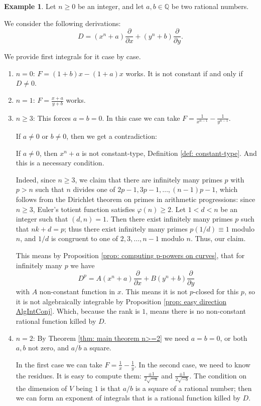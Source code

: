 \documentclass{amsart}
\renewcommand{\phi}{\varphi}
\theoremstyle{definition}
\newtheorem{example}[thm]{Example}
\begin{document}
\begin{example}\label{ex: x^n+a}
Let $n\ge 0$ be an integer, and let $a,b\in \mathbb{Q}$ be two rational numbers.

We consider the following derivations:
\[
D= (x^n+a)\frac{\partial}{\partial x} +(y^n+b)\frac{\partial}{\partial y}.
\]

We provide first integrals for it case by case.
\begin{enumerate}
    \item $n=0$: $F=(1+b)x-(1+a)x$ works. It is not constant if and only if $D\ne 0$.
    \item $n=1$: $F=\frac{x+a}{y+b}$ works.
    \item $n\ge 3$: This forces $a=b=0$. In this case we can take $F=\frac{1}{x^{n-1}}-\frac{1}{y^{n-1}}$.

    If $a\ne 0$ or $b\ne 0$, then we get a contradiction:
    
    If $a\ne 0$, then $x^n+a$ is not constant-type, Definition \ref{def: constant-type}. And this is a necessary condition.
    
    Indeed, since $n\ge 3$, we claim that there are infinitely many primes $p$ with $p>n$ such that $n$ divides one of $2p-1, 3p-1,\ldots, (n-1)p-1$, which follows from the Dirichlet theorem on primes in arithmetic progressions: since $n\ge 3$, Euler's totient function satisfies $\phi(n)\ge 2$. Let $1<d<n$ be an integer such that $(d,n)=1$.
    Then there exist infinitely many primes $p$ such that $nk+d=p$; thus there exist infinitely many primes $p(1/d)\equiv 1$ modulo $n$, and $1/d$ is congruent to one of $2,3,\ldots,n-1$ modulo $ n$. Thus, our claim.

    This means by Proposition \ref{prop: computing p-powers on curves}, that for infinitely many $p$ we have
    \[
    D^p=A(x^n+a)\frac{\partial}{\partial x} +B(y^n+b)\frac{\partial}{\partial y}
    \]
    with $A$ non-constant function in $x$. This means it is not $p$-closed for this $p$, so it is not algebraically integrable by Proposition \ref{prop: easy direction AlgIntConj}. Which, because the rank is $1$, means there is no non-constant rational function killed by $D$.

    \item $n=2$: By Theorem \ref{thm: main theorem n>=2} we need $a=b=0$, or both $a,b$ not zero, and $a/b$ a square.
    
    In the first case we can take $F=\frac{1}{x}-\frac{1}{y}$.
    In the second case, we need to know the residues. It is easy to compute them: $\frac{\pm 1}{2\sqrt{-a}}$ and $\frac{\pm 1}{2\sqrt{-b}}$. The condition on the dimension of $V$ being $1$ is that $a/b$ is a square of a rational number; then we can form an exponent of integrals that is a rational function killed by $D$.


\end{enumerate}
\end{example}
\end{document}
